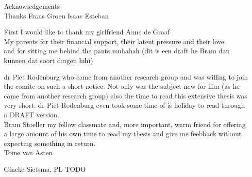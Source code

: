 {\LARGE Acknowledgements}\\
Thanks
Frans Groen
Isaac Esteban

First I would like to thank my girlfriend Anne de Graaf\\

My parents for their financial support, their latent pressure and their love.\\
and for sitting me behind the pants muhahah (dit is een draft he Bram dan kunnen dat
soort dingen hihi)

dr Piet Rodenburg who came from another research group and was willing to join
the comite on such a short notice.  Not only was the subject new for him (as he
came from another research group) also the time to read this extensive thesis
was very short.  dr Piet Rodenburg even took some time of is holiday to read through
a DRAFT version.\\

Bram Stoeller my fellow classmate and, more important, warm friend for offering a large amount of
his own time to read my thesis and give me feebback without expecting something in
return.\\

Toine van Asten

Gineke Sietsma, PL
TODO
